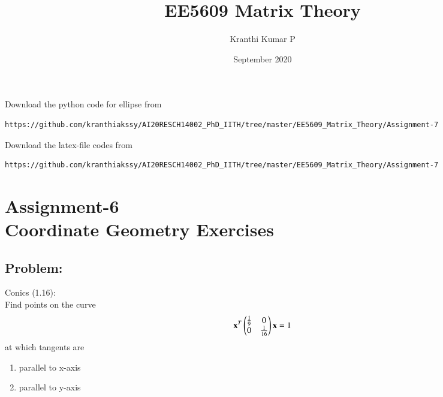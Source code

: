 \documentclass[journal,12pt,twocolumn]{IEEEtran}
\begin{document}
     \def\rightbox#1{\makebox[0in][r]{#1}}
     \def\centbox#1{\makebox[0in]{#1}}
     \def\topbox#1{\raisebox{-\baselineskip}[0in][0in]{#1}}
     \def\midbox#1{\raisebox{-0.5\baselineskip}[0in][0in]{#1}}
\vspace{3cm}
\title{EE5609 Matrix Theory}
\author{Kranthi Kumar P}
\date{September 2020}
\maketitle
\newpage
\bigskip
\renewcommand{\thefigure}{\theenumi}
\renewcommand{\thetable}{\theenumi}
Download the python code for ellipse from 
\begin{lstlisting}
https://github.com/kranthiakssy/AI20RESCH14002_PhD_IITH/tree/master/EE5609_Matrix_Theory/Assignment-7
\end{lstlisting}

Download the latex-file codes from 
%
\begin{lstlisting}
https://github.com/kranthiakssy/AI20RESCH14002_PhD_IITH/tree/master/EE5609_Matrix_Theory/Assignment-7
\end{lstlisting}
\section*{Assignment-6\\Coordinate Geometry Exercises}
\subsection*{Problem:}
Conics (1.16):\\
Find points on the curve 
\begin{align}
\mathbf{x}^T \begin{pmatrix}\frac{1}{9}&0\\0&\frac{1}{16}\end{pmatrix}\mathbf{x}=1
\label{eq:p0}
\end{align}
at which tangents are
\begin{enumerate}[label = (\alph*)]
\item parallel to x-axis
\item parallel to y-axis
\end{enumerate}
\end{document}

